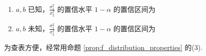 \begin{proposition}\label{prop:方差比的置信区间}
    \begin{enumerate}
    \item $a, b$ 已知，$\frac{\sigma_1^2}{\sigma_2^2}$ 的置信水平 $1-\alpha$ 的置信区间为
    \begin{equation}
        [\frac{S_a^2}{S_b^2}\frac{1}{F_{m,n}(\alpha/2)}, \frac{S_a^2}{S_b^2}\frac{1}{F_{m,n}(1-\alpha/2)}]
    \end{equation}

    \item $a, b$ 未知，$\frac{\sigma_1^2}{\sigma_2^2}$ 的置信水平 $1-\alpha$ 的置信区间为
    \begin{equation}
        [\frac{S_1^2}{S_2^2}\frac{1}{F_{m-1,n-1}(\alpha/2)}, \frac{S_1^2}{S_2^2}\frac{1}{F_{n-1,m-1}(1-\alpha/2)}]
    \end{equation}
\end{enumerate}
\end{proposition}
\begin{remark}
    为查表方便，经常用命题 \ref{prop:f_distribution_properties} 的(3).
\end{remark}

